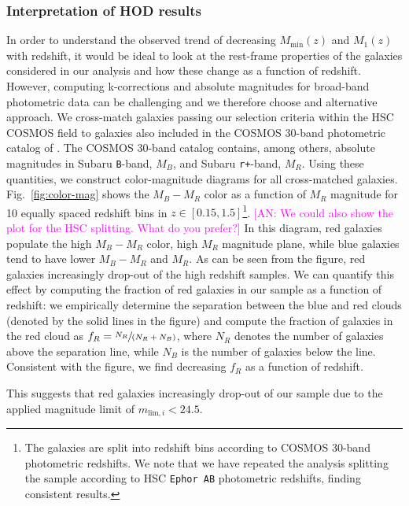 \documentclass[a4paper,11pt]{article}
\newcommand{\an}[1]{{\textcolor{magenta}{[AN: #1]}}}
\begin{document}
\subsubsection{Interpretation of HOD results}
In order to understand the observed trend of decreasing $M_{\mathrm{min}}(z)$ and $M_{1}(z)$ with redshift, it would be ideal to look at the rest-frame properties of the galaxies considered in our analysis and how these change as a function of redshift. However, computing k-corrections and absolute magnitudes for broad-band photometric data can be challenging and we therefore choose and alternative approach. We cross-match galaxies passing our selection criteria within the HSC COSMOS field to galaxies also included in the COSMOS 30-band photometric catalog of \cite{2016ApJS..224...24L}. The COSMOS 30-band catalog contains, among others, absolute magnitudes in Subaru \texttt{B}-band, $M_{B}$, and Subaru \texttt{r+}-band, $M_{R}$. Using these quantities, we construct color-magnitude diagrams for all cross-matched galaxies. Fig.~\ref{fig:color-mag} shows the $M_{B}-M_{R}$ color as a function of $M_{R}$ magnitude for 10 equally spaced redshift bins in $z \in [0.15, 1.5]$\footnote{The galaxies are split into redshift bins according to COSMOS 30-band photometric redshifts. We note that we have repeated the analysis splitting the sample according to HSC \texttt{Ephor AB} photometric redshifts, finding consistent results.}. \an{We could also show the plot for the HSC splitting. What do you prefer?} In this diagram, red galaxies populate the high $M_{B}-M_{R}$ color, high $M_{R}$ magnitude plane, while blue galaxies tend to have lower $M_{B}-M_{R}$ and $M_{R}$. As can be seen from the figure, red galaxies increasingly drop-out of the high redshift samples. We can quantify this effect by computing the fraction of red galaxies in our sample as a function of redshift: we empirically determine the separation between the blue and red clouds (denoted by the solid lines in the figure) and compute the fraction of galaxies in the red cloud as $f_{R} = \sfrac{N_{R}}{(N_{R}+N_{B})}$, where $N_{R}$ denotes the number of galaxies above the separation line, while $N_{B}$ is the number of galaxies below the line. Consistent with the figure, we find decreasing $f_{R}$ as a function of redshift. 

      This suggests that red galaxies increasingly drop-out of our sample due to the applied magnitude limit of $m_{\mathrm{lim}, i} < 24.5$.

\end{document}
